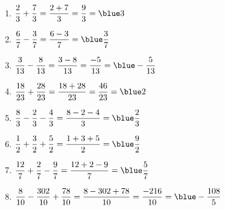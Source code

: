    \ \\ [-5mm]
   \begin{enumerate}
      \item $\dfrac23+\dfrac73 =\dfrac{2+7}{3} =\dfrac93 =\blue 3$ \medskip
      \item $\dfrac67-\dfrac37 =\dfrac{6-3}{7} =\blue \dfrac37$ \medskip
      \item $\dfrac3{13}-\dfrac8{13} =\dfrac{3-8}{13} =\dfrac{-5}{13} =\blue -\dfrac{5}{13}$ \medskip
      \item $\dfrac{18}{23}+\dfrac{28}{23} =\dfrac{18+28}{23} =\dfrac{46}{23} =\blue 2$ \medskip
      \item $\dfrac83-\dfrac23-\dfrac43 =\dfrac{8-2-4}{3} =\blue \dfrac23$ \medskip
      \item $\dfrac12+\dfrac32+\dfrac52 =\dfrac{1+3+5}{2} =\blue \dfrac92$ \medskip
      \item $\dfrac{12}7+\dfrac27-\dfrac97 =\dfrac{12+2-9}{7} =\blue \dfrac{5}{7}$ \medskip
      \item $\dfrac8{10}-\dfrac{302}{10}+\dfrac{78}{10} =\dfrac{8-302+78}{10} =\dfrac{-216}{10} =\blue -\dfrac{108}{5}$
   \end{enumerate}
